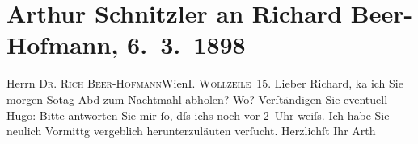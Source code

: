 

         
         \renewcommand{\erwaehntePersonen}{Personen: Richard Beer-Hofmann, Hugo von Hofmannsthal}
         \renewcommand{\erwaehnteOrte}{Orte: I., Innere Stadt, Wien, Wollzeile}
         \renewcommand{\erwaehnteWerke}{}
               \section[Arthur Schnitzler an Richard Beer-Hofmann, 6. 3. 1898]{ Arthur Schnitzler an Richard Beer-Hofmann, 6. 3. 1898}\nopagebreak{}\rehead{ }\begin{ledgroupsized}[t]{13cm}\normalsize\beginnumbering \toendnotes[C]{\smallbreak\pagebreak[2]} 
\pstart{}{\pb}Herrn \textsc{Dr. Rich
                     Beer-Hofmann}\pend{}\pstart{}Wien\pend{}\pstart{}\textsc{I. Wollzeile 15}.\pend{}{\bigskip}\pstart
           \noindent{}{\pb}Lieber Richard, ka{\geminationn} ich Sie morgen So{\geminationn}tag{ }Abd
               zum Nachtmahl abholen? Wo? Verſtändigen Sie eventuell Hugo: Bitte antworten Sie mir ſo, dſs ichs noch vor 2 Uhr weiſs. Ich
               habe Sie neulich Vormittg vergeblich herunterzuläuten verſucht.\pend
           \pstart  Herzlichſt
               Ihr \spacefill\mbox{Arth}\pend{}
         
         \endnumbering{}\end{ledgroupsized}  \newcommand{\dateiname}{L00780}\newcommand{\titel}{Arthur Schnitzler an Richard Beer-Hofmann, 6. 3. 1898}\newcommand{\editorInnen}{Martin Anton Müller und Gerd-Hermann Susen}
      